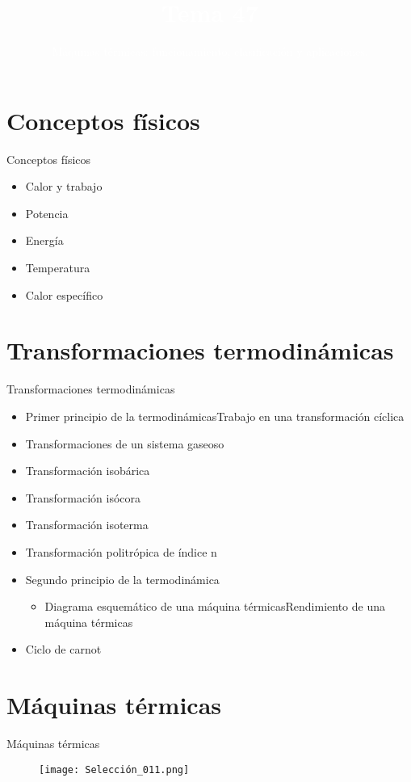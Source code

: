 \documentclass{beamer}
\title{\textcolor{white}{Tema 47}}
\subtitle{\textcolor{white}{Máquinas térmicas: funcionamiento, clasificación y aplicaciones.}}
\begin{document}
\begin{frame}[plain,t]
\titlepage
\end{frame}



\section{Conceptos físicos}
\begin{frame}{Conceptos físicos}
    \begin{itemize}
        \item Calor y trabajo
        \item Potencia
        \item Energía
        \item Temperatura
        \item Calor específico
    \end{itemize}
  
\end{frame}

\section{Transformaciones termodinámicas}
\begin{frame}{Transformaciones termodinámicas}
    \begin{itemize}
        \item Primer principio de la termodinámicasTrabajo en una transformación cíclica
        \item Transformaciones de un sistema gaseoso
        \item Transformación isobárica
        \item Transformación isócora
        \item Transformación isoterma
        \item Transformación politrópica de índice n
        \item Segundo principio de la termodinámica
        \begin{itemize}
            \item Diagrama esquemático de una máquina térmicasRendimiento de una máquina térmicas
        \end{itemize}
        \item Ciclo de carnot
    \end{itemize}
\end{frame}


\section{Máquinas térmicas}
\begin{frame}{Máquinas térmicas}
    \begin{figure}[h]
        \texttt{[image: Selección\_011.png]}
        \end{figure}
\end{frame}
\end{document}
